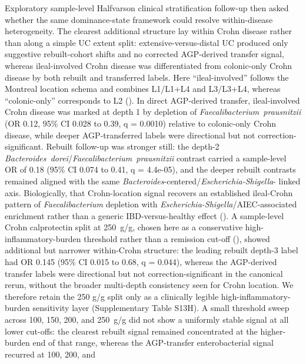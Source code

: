 \documentclass[
  11pt,
]{article}
\newcommand{\taxon}[1]{\emph{#1}}
\begin{document}
Exploratory sample-level Halfvarson clinical stratification follow-up
then asked whether the same dominance-state framework could resolve
within-disease heterogeneity. The clearest additional structure lay
within Crohn disease rather than along a simple UC extent split:
extensive-versus-distal UC produced only suggestive rebuilt-cohort
shifts and no corrected AGP-derived transfer signal, whereas
ileal-involved Crohn disease was differentiated from colonic-only
Crohn disease by both rebuilt and transferred labels. Here
``ileal-involved'' follows the Montreal location schema and combines
L1/L1+L4 and L3/L3+L4, whereas ``colonic-only'' corresponds to L2
(). In direct
AGP-derived transfer, ileal-involved Crohn disease was marked at depth 1
by depletion of \taxon{Faecalibacterium~prausnitzii}
(OR 0.12, 95\% CI 0.028 to 0.39, q = 0.0010) relative to colonic-only
Crohn disease, while deeper AGP-transferred labels were directional but
not correction-significant. Rebuilt follow-up was stronger still: the
depth-2
\emph{Bacteroides~dorei}/\emph{Faecalibacterium~prausnitzii}
contrast carried a sample-level OR of 0.18 (95\% CI 0.074 to 0.41,
q = 4.4e-05), and the deeper rebuilt contrasts remained aligned with
the same \taxon{Bacteroides}-centered/\taxon{Escherichia-Shigella}-
linked axis. Biologically, that Crohn-location signal recovers an
established ileal-Crohn pattern of
\taxon{Faecalibacterium} depletion with
\taxon{Escherichia-Shigella}/AIEC-associated enrichment rather than a
generic IBD-versus-healthy effect
().
A sample-level Crohn calprotectin split at
250~\textmu g/g, chosen here as a conservative high-inflammatory-burden
threshold rather than a remission cut-off
(),
showed additional but narrower within-Crohn structure: the leading
rebuilt depth-3 label had OR 0.145 (95\% CI 0.015 to 0.68, q = 0.044),
whereas the AGP-derived transfer labels were directional but not
correction-significant in the canonical rerun, without the broader
multi-depth consistency seen for Crohn location. We therefore retain the 250
\textmu g/g split only as a clinically legible high-inflammatory-burden
sensitivity layer (Supplementary Table S13H). A small threshold sweep across
100, 150, 200, and 250~\textmu g/g did not show a uniformly stable
signal at all lower cut-offs: the clearest rebuilt signal remained
concentrated at the higher-burden end of that range, whereas the
AGP-transfer enterobacterial signal recurred at 100, 200, and
\end{document}
